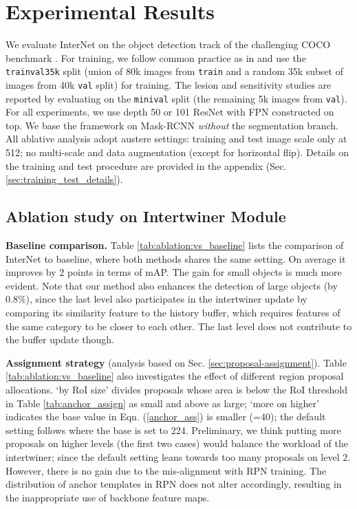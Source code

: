 \documentclass{article} \usepackage{iclr2019_conference,times}
\begin{document}
\section{Experimental Results}
We evaluate
InterNet on the object detection track of the challenging COCO benchmark \citep{coco}. For training, we follow common practice as in \citep{ren2015_faster_rcnn,he2017_mask_rcnn} and use the \texttt{trainval35k} split (union of 80k images from \texttt{train} and a random 35k subset of images from  40k \texttt{val} split) for training. The lesion and sensitivity studies are reported by
evaluating on the \texttt{minival} split (the remaining 5k images
from \texttt{val}). 
For all experiments, we use depth 50 or 101 ResNet \citep{he2016_resnet} with FPN \citep{lin2017_FPN} constructed on top. 
{We base the framework on Mask-RCNN \citep{he2017_mask_rcnn} \textit{without} the segmentation branch. }
All ablative analysis adopt austere settings: training and test image scale only at 512; no multi-scale and data augmentation (except for horizontal flip).
Details on the training and test procedure are provided in the appendix (Sec. \ref{sec:training_test_details}).

\subsection{Ablation study on Intertwiner Module}\label{sec:ablative-analysis}



\textbf{Baseline comparison.} Table \ref{tab:ablation:vs_baseline} lists the comparison of InterNet to baseline, where both methods shares the same setting. 
On average it improves by 2 points in terms of mAP. The gain for small objects is much more evident. Note that our method also enhances the detection of large objects (by 0.8\%), since the last level also participates in the intertwiner update by comparing its similarity feature to the history buffer, which requires features of the same category to be closer to each other. The last level does not contribute to the buffer update though.


{\textbf{Assignment strategy} (analysis based on Sec. \ref{sec:proposal-assignment}).}
Table \ref{tab:ablation:vs_baseline} also investigates the effect of different region proposal allocations. `by RoI size' divides proposals whose area is below the RoI threshold in Table \ref{tab:anchor_assign} as small and above as large; `more on higher' indicates the base value in Eqn. (\ref{anchor_ass}) is smaller (=40); the default setting follows \citep{lin2017_FPN} where the base is set to 224. 
Preliminary, we think putting more proposals on higher levels (the first two cases) would balance the workload of the intertwiner; since the default setting leans towards too many proposals on level 2. However, there is no gain 
due to the mis-alignment with RPN training. 
The distribution of anchor templates in RPN does not alter accordingly, 
resulting in the inappropriate use of backbone feature maps.
\end{document}
